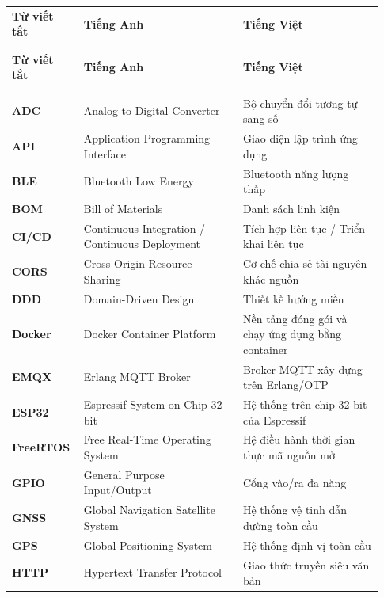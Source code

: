 \documentclass[a4paper]{extarticle}
\newcounter{none} %
\begin{document}
{\def\LTcaptype{none} %
\setlength{\tabcolsep}{4pt}
\begin{longtable}{|L{0.160\linewidth}|L{0.410\linewidth}|L{0.360\linewidth}|}
\\\hline
\textbf{Từ viết tắt} & \textbf{Tiếng Anh} & \textbf{Tiếng Việt} \\
\\\hline
\endfirsthead
\\\hline
\textbf{Từ viết tắt} & \textbf{Tiếng Anh} & \textbf{Tiếng Việt} \\
\\\hline
\endhead
\\\hline
\endfoot
\endlastfoot
\textbf{ADC} & Analog-to-Digital Converter & Bộ chuyển đổi tương tự sang
số \\\hline
\textbf{API} & Application Programming Interface & Giao diện lập trình
ứng dụng \\\hline
\textbf{BLE} & Bluetooth Low Energy & Bluetooth năng lượng thấp \\\hline
\textbf{BOM} & Bill of Materials & Danh sách linh kiện \\\hline
\textbf{CI/CD} & Continuous Integration / Continuous Deployment & Tích
hợp liên tục / Triển khai liên tục \\\hline
\textbf{CORS} & Cross-Origin Resource Sharing & Cơ chế chia sẻ tài nguyên
khác nguồn \\\hline
\textbf{DDD} & Domain-Driven Design & Thiết kế hướng miền \\\hline
\textbf{Docker} & Docker Container Platform & Nền tảng đóng gói và chạy
ứng dụng bằng container \\\hline
\textbf{EMQX} & Erlang MQTT Broker & Broker MQTT xây dựng trên Erlang/OTP \\\hline
\textbf{ESP32} & Espressif System-on-Chip 32-bit & Hệ thống trên chip
32-bit của Espressif \\\hline
\textbf{FreeRTOS} & Free Real-Time Operating System & Hệ điều hành thời
gian thực mã nguồn mở \\\hline
\textbf{GPIO} & General Purpose Input/Output & Cổng vào/ra đa năng \\\hline
\textbf{GNSS} & Global Navigation Satellite System & Hệ thống vệ tinh
dẫn đường toàn cầu \\\hline
\textbf{GPS} & Global Positioning System & Hệ thống định vị toàn cầu \\\hline
\textbf{HTTP} & Hypertext Transfer Protocol & Giao thức truyền siêu văn
bản \\\hline

\end{longtable}}
\end{document}
